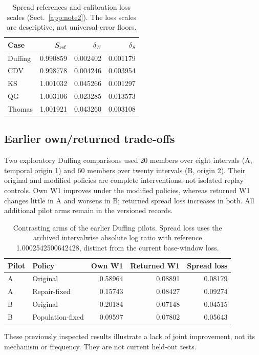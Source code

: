\documentclass[gmd,manuscript]{copernicus}
\begin{document}
\begin{table}[htbp]\caption{Spread references and calibration loss scales (Sect.~\ref{app:note2}). The loss scales are descriptive, not universal error floors.}\label{tab:v4-calibration}
\centering\small\begin{tabular}{lrrr}\toprule
Case & $S_{\rm ref}$ & $\delta_W$ & $\delta_S$\\\midrule
Duffing & 0.990859 & 0.002402 & 0.001179 \\
CDV & 0.998778 & 0.004246 & 0.003954 \\
KS & 1.001032 & 0.045266 & 0.001297 \\
QG & 1.003106 & 0.023285 & 0.013573 \\
Thomas & 1.001921 & 0.043260 & 0.003108 \\
\bottomrule\end{tabular}\end{table}

\subsection{Earlier own/returned trade-offs}\label{app:note8}
Two exploratory Duffing comparisons used 20 members over eight intervals (A, temporal origin 1) and 60 members over twenty intervals (B, origin 2). Their original and modified policies are complete interventions, not isolated replay controls. Own W1 improves under the modified policies, whereas returned W1 changes little in A and worsens in B; returned spread loss increases in both. All additional pilot arms remain in the versioned records.

\begin{table}[htbp]
\caption{Contrasting arms of the earlier Duffing pilots. Spread loss uses the archived intervalwise absolute log ratio with reference 1.0002542500642428, distinct from the current base-window loss.}
\label{tab:legacy-population}
\centering\small\begin{tabular}{llrrr}\toprule
Pilot & Policy & Own W1 & Returned W1 & Spread loss \\ \midrule
A & Original & 0.58964 & 0.08891 & 0.08179 \\
A & Repair-fixed & 0.15743 & 0.08427 & 0.09274 \\
B & Original & 0.20184 & 0.07148 & 0.04515 \\
B & Population-fixed & 0.09597 & 0.07802 & 0.05643 \\
\bottomrule\end{tabular}\end{table}
These previously inspected results illustrate a lack of joint improvement, not its mechanism or frequency. They are not current held-out tests.
\end{document}
